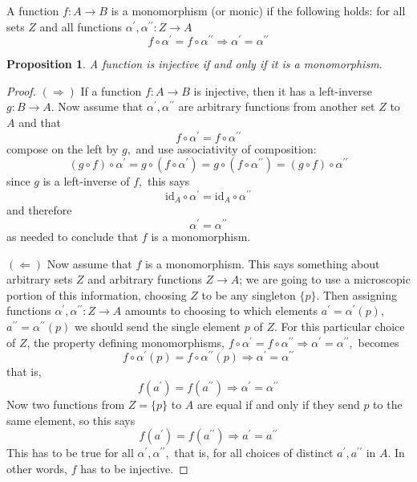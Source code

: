 \documentclass[12pt]{book}
\theoremstyle{definition}\newtheorem{dfn}{Définition}[chapter]
\theoremstyle{plain}\newtheorem{thm}{Théorème}[chapter]
\theoremstyle{plain}\newtheorem{prp}{Proposition}[chapter]
\theoremstyle{plain}\newtheorem{lem}{\bf Lemme}[chapter]
\theoremstyle{plain}\newtheorem{axm}{\bf Axiome}[chapter]
\theoremstyle{plain}\newtheorem{lmm}{\bf Lemme}[chapter]
\theoremstyle{plain}\newtheorem{exm}{\bf Example}[chapter]
\theoremstyle{plain}\newtheorem{cor}{\bf Corollaire}[chapter]
\theoremstyle{remark}\newtheorem{rem}{Remarque}[chapter]
\begin{document}
A function $f: A \rightarrow B$ is a monomorphism (or monic) if the following holds:
for all sets $Z$ and all functions $\alpha^{\prime}, \alpha^{\prime \prime}: Z \rightarrow A$
$$
f \circ \alpha^{\prime}=f \circ \alpha^{\prime \prime} \Longrightarrow \alpha^{\prime}=\alpha^{\prime \prime}
$$
\begin{prp}
 A function is injective if and only if it is a monomorphism.
\end{prp}
\begin{proof}
$(\Longrightarrow)$ If a function $f: A \rightarrow B$ is injective, then it has a left-inverse $g: B \rightarrow A$. Now assume that $\alpha^{\prime}, \alpha^{\prime \prime}$ are arbitrary functions from another set $Z$ to $A$ and that
$$
f \circ \alpha^{\prime}=f \circ \alpha^{\prime \prime}
$$
compose on the left by $g,$ and use associativity of composition:
$$
(g \circ f) \circ \alpha^{\prime}=g \circ\left(f \circ \alpha^{\prime}\right)=g \circ\left(f \circ \alpha^{\prime \prime}\right)=(g \circ f) \circ \alpha^{\prime \prime}
$$
since $g$ is a left-inverse of $f,$ this says
$$
\mathrm{id}_{A} \circ \alpha^{\prime}=\mathrm{id}_{A} \circ \alpha^{\prime \prime}
$$
and therefore
$$
\alpha^{\prime}=\alpha^{\prime \prime}
$$
as needed to conclude that $f$ is a monomorphism.

$(\Longleftarrow)$ Now assume that $f$ is a monomorphism. This says something about arbitrary sets $Z$ and arbitrary functions $Z \rightarrow A$; we are going to use a microscopic portion of this information, choosing $Z$ to be any singleton $\{p\}$. Then assigning functions $\alpha^{\prime}, \alpha^{\prime \prime}: Z \rightarrow A$ amounts to choosing to which elements $a^{\prime}=\alpha^{\prime}(p)$, $a^{\prime \prime}=\alpha^{\prime \prime}(p)$ we should send the single element $p$ of $Z$. For this particular choice of $Z$, the property defining monomorphisms, $f \circ \alpha^{\prime}=f \circ \alpha^{\prime \prime} \Longrightarrow \alpha^{\prime}=\alpha^{\prime \prime},$ becomes $$
f \circ \alpha^{\prime}(p)=f \circ \alpha^{\prime \prime}(p) \Longrightarrow \alpha^{\prime}=\alpha^{\prime \prime}
$$
that is,
$$
f\left(a^{\prime}\right)=f\left(a^{\prime \prime}\right) \Longrightarrow \alpha^{\prime}=\alpha^{\prime \prime}
$$
Now two functions from $Z=\{p\}$ to $A$ are equal if and only if they send $p$ to the same element, so this says
$$
f\left(a^{\prime}\right)=f\left(a^{\prime \prime}\right) \Longrightarrow a^{\prime}=a^{\prime \prime}
$$
This has to be true for all $\alpha^{\prime}, \alpha^{\prime \prime},$ that is, for all choices of distinct $a^{\prime}, a^{\prime \prime}$ in $A$. In other words, $f$ has to be injective.

\end{proof} 
\end{document}
